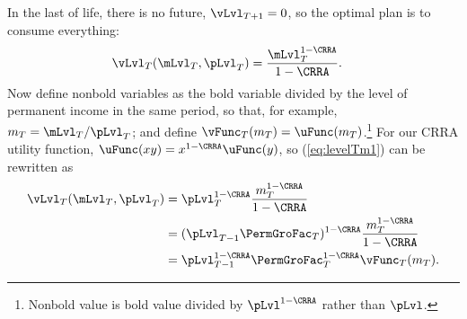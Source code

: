 \documentclass[titlepage, headings=optiontotocandhead]{\econtex}
\begin{document}
In the last {\interval} of life, there is no
future, ${\vLvl}
_{T+1} = 0$, so
the optimal plan is to consume everything:
\begin{equation}\begin{gathered}\begin{aligned}
      {\vLvl}
_{T}(\mLvl_{T},\pLvl_{T})  & = \frac{\mLvl_{T}^{1-\CRRA}}{1-\CRRA}. \label{eq:levelTm1}
    \end{aligned}\end{gathered}\end{equation}
Now define nonbold variables as the bold variable divided by
the level of permanent income in the same period, so that, for
example, ${m}_{T}=\mLvl_{T}/\pLvl_{T}$; and define
$\vFunc_{T}({m}_{T}) = \uFunc({m}_{T})$.\footnote{Nonbold value is bold value divided by $\pLvl^{1-\CRRA}$ rather than $\pLvl$.}  For our CRRA utility function, $\uFunc(xy)=x^{1-\CRRA}\uFunc(y)$, so (\ref{eq:levelTm1}) can be rewritten as
\begin{equation}\begin{gathered}\begin{aligned}
      {\vLvl}
      _{T}(\mLvl_{T},\pLvl_{T})  & = \pLvl_{T}^{1-\CRRA}\frac{{m}_{T}^{1-\CRRA}}{1-\CRRA}
      \\ &      = (\pLvl_{T-1}\PermGroFac_{T})^{1-\CRRA}\frac{{m}_{T}^{1-\CRRA}}{1-\CRRA}
      \\ &= \pLvl_{T-1}^{1-\CRRA}\PermGroFac_{T}^{1-\CRRA}\vFunc_{T}({m}_{T}). \label{eq:vT}
    \end{aligned}\end{gathered}\end{equation}
\end{document}
